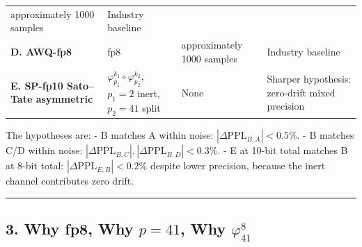 \documentclass[
  11pt,
]{article}
\begin{document}
\begin{longtable}[]{@{}llll@{}}
\begin{minipage}[t]{0.22\columnwidth}
approximately 1000 samples\strut
\end{minipage} & \begin{minipage}[t]{0.22\columnwidth}\raggedright
Industry baseline\strut
\end{minipage}\tabularnewline
\begin{minipage}[t]{0.22\columnwidth}\raggedright
\textbf{D. AWQ-fp8}\strut
\end{minipage} & \begin{minipage}[t]{0.22\columnwidth}\raggedright
fp8\strut
\end{minipage} & \begin{minipage}[t]{0.22\columnwidth}\raggedright
approximately 1000 samples\strut
\end{minipage} & \begin{minipage}[t]{0.22\columnwidth}\raggedright
Industry baseline\strut
\end{minipage}\tabularnewline
\begin{minipage}[t]{0.22\columnwidth}\raggedright
\textbf{E. SP-fp10 Sato--Tate asymmetric}\strut
\end{minipage} & \begin{minipage}[t]{0.22\columnwidth}\raggedright
\(\varphi_{p_1}^{k_1} \circ \varphi_{p_2}^{k_2}\), \(p_1 = 2\) inert,
\(p_2 = 41\) split\strut
\end{minipage} & \begin{minipage}[t]{0.22\columnwidth}\raggedright
None\strut
\end{minipage} & \begin{minipage}[t]{0.22\columnwidth}\raggedright
Sharper hypothesis: zero-drift mixed precision\strut
\end{minipage}\tabularnewline
\bottomrule
\end{longtable}

The hypotheses are: - B matches A within noise:
\(|\Delta\mathrm{PPL}_{B,A}| < 0.5\%\). - B matches C/D within noise:
\(|\Delta\mathrm{PPL}_{B,C}|, |\Delta\mathrm{PPL}_{B,D}| < 0.3\%\). - E
at 10-bit total matches B at 8-bit total:
\(|\Delta\mathrm{PPL}_{E,B}| < 0.2\%\) despite lower precision, because
the inert channel contributes zero drift.

\begin{center}\rule{0.5\linewidth}{0.5pt}\end{center}

\hypertarget{why-fp8-why-p-41-why-varphi_418}{%
\subsection{\texorpdfstring{3. Why fp8, Why \(p = 41\), Why
\(\varphi_{41}^8\)}{3. Why fp8, Why p = 41, Why \textbackslash varphi\_\{41\}\^{}8}}\label{why-fp8-why-p-41-why-varphi_418}}
\end{document}
